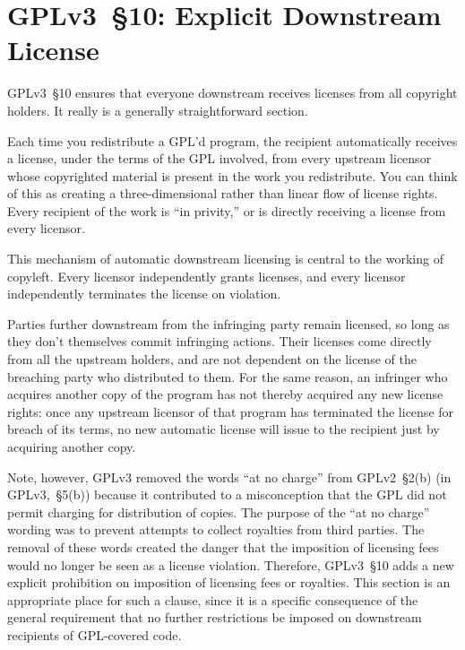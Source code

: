 \section{GPLv3~\S10: Explicit Downstream License}
\label{GPLv3s10}


GPLv3~\S10 ensures that everyone downstream receives licenses from all
copyright holders.  It really is a generally straightforward section.


Each time you redistribute a GPL’d program, the recipient automatically
receives a license, under the terms of the GPL involved, from every upstream
licensor whose copyrighted material is present in the work you
redistribute. You can think of this as creating a three-dimensional rather
than linear flow of license rights. Every recipient of the work is ``in
privity,'' or is directly receiving a license from every licensor.

This mechanism of automatic downstream licensing is central to the working of
copyleft. Every licensor independently grants licenses, and every licensor
independently terminates the license on violation.

Parties further downstream from
the infringing party remain licensed, so long as they don’t themselves commit
infringing actions. Their licenses come directly from all the upstream
holders, and are not dependent on the license of the breaching party who
distributed to them. For the same reason, an infringer who acquires another
copy of the program has not thereby acquired any new license rights: once any
upstream licensor of that program has terminated the license for breach of
its terms, no new automatic license will issue to the recipient just by
acquiring another copy.


Note, however, GPLv3 removed the words ``at no charge'' from GPLv2~\S2(b) (in
GPLv3,~\S5(b)) because it contributed to a misconception that the GPL did not
permit charging for distribution of copies.  The purpose of the ``at no
charge'' wording was to prevent attempts to collect royalties from third
parties.  The removal of these words created the danger that the imposition
of licensing fees would no longer be seen as a license violation.  Therefore,
GPLv3~\S10 adds a new explicit prohibition on imposition of licensing fees or
royalties.  This section is an appropriate place for such a clause, since it
is a specific consequence of the general requirement that no further
restrictions be imposed on downstream recipients of GPL-covered code.

